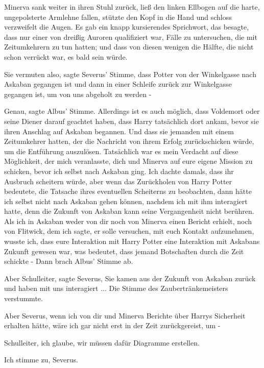 Minerva sank weiter in ihren Stuhl zurück, ließ den linken Ellbogen auf die
harte, ungepolsterte Armlehne fallen, stützte den Kopf in die Hand und schloss
verzweifelt die Augen. Es gab ein knapp kursierendes Sprichwort, das besagte,
dass nur einer von dreißig Auroren qualifiziert war, Fälle zu untersuchen, die
mit Zeitumkehrern zu tun hatten; und dass von diesen wenigen die Hälfte, die
nicht schon verrückt war, es bald sein würde.

\glqq{}Sie vermuten also\grqq{}, sagte Severus' Stimme, \glqq{}dass Potter von der
Winkelgasse nach Askaban gegangen ist und dann in einer Schleife zurück zur
Winkelgasse gegangen ist, um von uns abgeholt zu werden -\grqq{}

\glqq{}Genau\grqq{}, sagte Albus' Stimme. \glqq{}Allerdings ist es auch möglich,
dass Voldemort oder seine Diener darauf geachtet haben, dass Harry tatsächlich
dort ankam, bevor sie ihren Anschlag auf Askaban begannen. Und dass sie jemanden
mit einem Zeitumkehrer hatten, der die Nachricht von ihrem Erfolg zurückschicken
würde, um die Entführung auszulösen. Tatsächlich war es mein Verdacht auf diese
Möglichkeit, der mich veranlasste, dich und Minerva auf eure eigene Mission zu
schicken, bevor ich selbst nach Askaban ging. Ich dachte damals, dass ihr
Ausbruch scheitern würde, aber wenn das Zurückholen von Harry Potter bedeutete,
die Tatsache ihres eventuellen Scheiterns zu beobachten, dann hätte ich selbst
nicht nach Askaban gehen können, nachdem ich mit ihm interagiert hatte, denn die
Zukunft von Askaban kann seine Vergangenheit nicht berühren. Als ich in Askaban
weder von dir noch von Minerva einen Bericht erhielt, noch von Flitwick, dem ich
sagte, er solle versuchen, mit euch Kontakt aufzunehmen, wusste ich, dass eure
Interaktion mit Harry Potter eine Interaktion mit Askabans Zukunft gewesen war,
was bedeutet, dass jemand Botschaften durch die Zeit schickte -\grqq{} Dann
brach Albus' Stimme ab.

\glqq{}Aber Schulleiter\grqq{}, sagte Severus, \glqq{}Sie kamen aus der Zukunft
von Askaban zurück und haben mit uns interagiert ...\grqq{} Die Stimme des
Zaubertränkemeisters verstummte.

\glqq{}Aber Severus, wenn ich von dir und Minerva Berichte über Harrys Sicherheit
erhalten hätte, wäre ich gar nicht erst in der Zeit zurückgereist, um -\grqq{}

\glqq{}Schulleiter, ich glaube, wir müssen dafür Diagramme erstellen.\grqq{}

\glqq{}Ich stimme zu, Severus.\grqq{}

